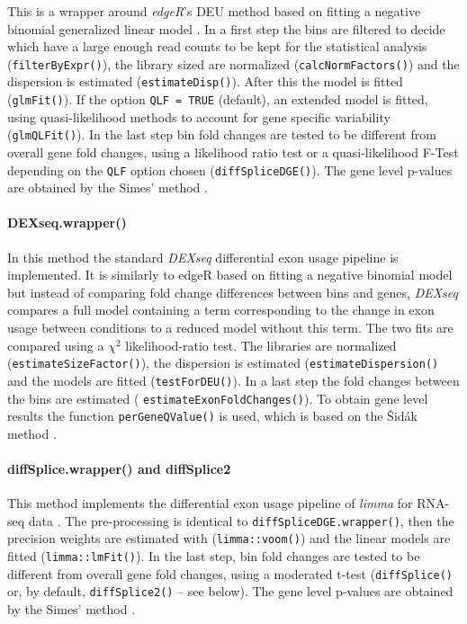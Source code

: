 \documentclass{bmcart}
\begin{document}
This is a wrapper around \textit{edgeR}'s DEU method based on fitting a negative binomial generalized linear model \cite{Robinson2009EdgeR:Data}. In a first step the bins are filtered to decide which have a large enough read counts to be kept for the statistical analysis (\texttt{filterByExpr()}), the library sized are normalized (\texttt{calcNormFactors()}) and the dispersion is estimated (\texttt{estimateDisp()}). After this the model is fitted (\texttt{glmFit()}). If the option \texttt{QLF = TRUE} (default), an extended model is fitted, using quasi-likelihood methods to account for gene specific variability (\texttt{glmQLFit()}). In the last step bin fold changes are tested to be different from overall gene fold changes, using a likelihood ratio test or a quasi-likelihood F-Test depending on the \texttt{QLF} option chosen (\texttt{diffSpliceDGE()}).  The gene level p-values are obtained by the Simes' method \cite{Simes1986AnSignificance}. 
\paragraph{DEXseq.wrapper()}

In this method the standard \textit{DEXseq} differential exon usage pipeline \cite{Anders2012DetectingData} is implemented. It is similarly to edgeR based on fitting a negative binomial model but instead of comparing fold change differences between bins and genes, \textit{DEXseq} compares a full model containing a term corresponding to the change in exon usage between conditions to a reduced model without this term. The two fits are compared using a $\chi^2$ likelihood-ratio test. The libraries are normalized (\texttt{estimateSizeFactor()}), the dispersion is estimated (\texttt{estimateDispersion()} and the models are fitted (\texttt{testForDEU()}). In a last step the fold changes between the bins are estimated ( \texttt{estimateExonFoldChanges()}). To obtain gene level results the function \texttt{perGeneQValue()} is used, which is based on the Šidák method \cite{Sidak1967RectangularDistributions}.

\paragraph{diffSplice.wrapper() and diffSplice2}
\label{sec:diffSplice2}
This method implements the differential exon usage pipeline of \textit{limma} for RNA-seq data \cite{Ritchie2015LimmaStudies}. The pre-processing is identical to \texttt{diffSpliceDGE.wrapper()}, then the precision weights are estimated with (\texttt{limma::voom()}) and the linear models are fitted (\texttt{limma::lmFit()}). In the last step, bin fold changes are tested to be different from overall gene fold changes, using a moderated t-test (\texttt{diffSplice()} or, by default, \texttt{diffSplice2()} -- see below). The gene level p-values are obtained by the Simes' method \cite{Simes1986AnSignificance}.
\end{document}
